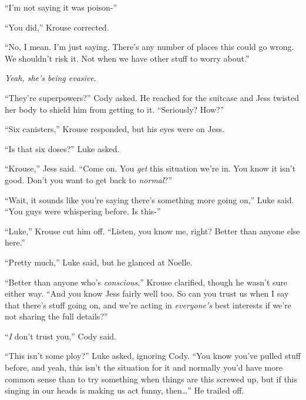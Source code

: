 ``I'm not saying it was poison-''



``You did,'' Krouse corrected.



``No, I mean.  I'm just saying.  There's any number of places this could go wrong.  We shouldn't risk it.  Not when we have other stuff to worry about.''



\emph{Yeah, she's being evasive}.



``They're superpowers?'' Cody asked.  He reached for the suitcase and Jess twisted her body to shield him from getting to it.  ``Seriously?  How?''



``Six canisters,'' Krouse responded, but his eyes were on Jess.



``Is that six doses?'' Luke asked.



``Krouse,'' Jess said.  ``Come on.  You \emph{get} this situation we're in.  You know it isn't good.  Don't you want to get back to \emph{normal}?''



``Wait, it sounds like you're saying there's something more going on,'' Luke said.  ``You guys were whispering before.  Is this-''



``Luke,'' Krouse cut him off.  ``Listen, you know me, right?  Better than anyone else here.''



``Pretty much,'' Luke said, but he glanced at Noelle.



``Better than anyone who's \emph{conscious},'' Krouse clarified, though he wasn't sure either way.  ``And you know Jess fairly well too.  So can you trust us when I say that there's stuff going on, and we're acting in \emph{everyone's} best interests if we're not sharing the full details?''



``\emph{I} don't trust you,'' Cody said.



``This isn't some ploy?'' Luke asked, ignoring Cody.  ``You know you've pulled stuff before, and yeah, this isn't the situation for it and normally you'd have more common sense than to try something when things are this screwed up, but if this singing in our heads is making us act funny, then\ldots''  He trailed off.



